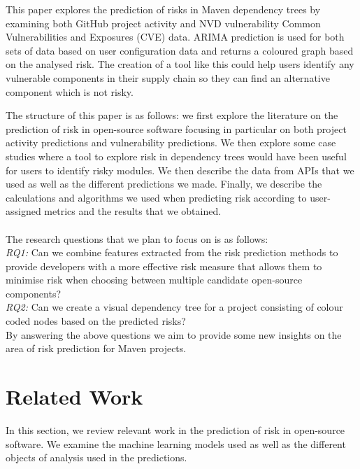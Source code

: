 \documentclass[10pt, compsoc, conference]{IEEEtran}
\begin{document}
This paper explores the prediction of risks in Maven dependency trees by examining both GitHub project activity and NVD vulnerability Common Vulnerabilities and Exposures (CVE) data. ARIMA prediction is used for both sets of data based on user configuration data and returns a coloured graph based on the analysed risk. The creation of a tool like this could help users identify any vulnerable components in their supply chain so they can find an alternative component which is not risky. 

The structure of this paper is as follows: we first explore the literature on the prediction of risk in open-source software focusing in particular on both project activity predictions and vulnerability predictions. We then explore some case studies where a tool to explore risk in dependency trees would have been useful for users to identify risky modules. We then describe the data from APIs that we used as well as the different predictions we made. Finally, we describe the calculations and algorithms we used when predicting risk according to user-assigned metrics and the results that we obtained. 
\\\\
The research questions that we plan to focus on is as follows:\\

\textit{RQ1:} Can we combine features extracted from the risk prediction methods to provide developers with a more effective risk measure that allows them to minimise risk when choosing between multiple candidate open-source components?\\

\textit{RQ2:} Can we create a visual dependency tree for a project consisting of colour coded nodes based on the predicted risks?\\ 

By answering the above questions we aim to provide some new insights on the area of risk prediction for Maven projects. 

\section{Related Work}
In this section, we review relevant work in the prediction of risk in open-source software. We examine the machine learning models used as well as the different objects of analysis used in the predictions.  
\end{document}
